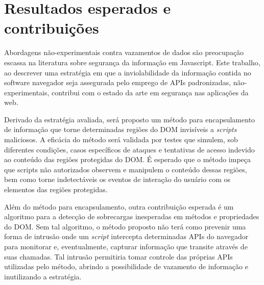 \section{Resultados esperados e contribuições}


Abordagens não-experimentais contra vazamentos de dados são preocupação escassa na literatura sobre segurança da informação em Javascript. Este trabalho, ao descrever uma estratégia em que a inviolabilidade da informação contida no software navegador seja assegurada pelo emprego de APIs padronizadas, não-experimentais, contribui com o estado da arte em segurança nas aplicações da web.

Derivado da estratégia avaliada, será proposto um método para encapsulamento de informação que torne determinadas regiões do DOM invisíveis a \textit{scripts} maliciosos. A eficácia do método será validada por testes que simulem, sob diferentes condições, casos específicos de ataques e tentativas de acesso indevido ao conteúdo das regiões protegidas do DOM. É esperado que o método impeça que scripts não autorizados observem e manipulem o conteúdo dessas regiões, bem como torne indetectáveis os eventos de interação do usuário com os elementos das regiões protegidas.

Além do método para encapsulamento, outra contribuição esperada é um algoritmo para a detecção de sobrecargas inesperadas em métodos e propriedades do DOM. Sem tal algoritmo, o método proposto não terá como prevenir uma forma de intrusão onde um \textit{script} intercepta determinadas APIs do navegador para monitorar e, eventualmente, capturar informação que transite através de suas chamadas. Tal intrusão permitiria tomar controle das próprias APIs utilizadas pelo método, abrindo a possibilidade de vazamento de informação e inutilizando a estratégia.

